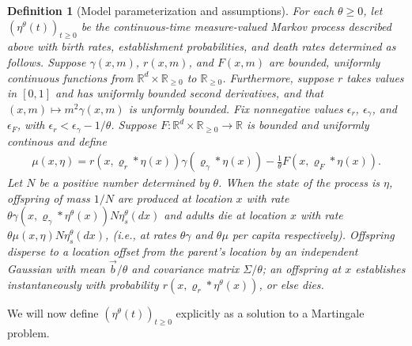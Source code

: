 \documentclass[12pt]{article}
\newtheorem{definition}[theorem]{Definition}
\newcommand{\IR}{\mathbb R}
\newcommand{\meanq}{\vec b}    %
\newcommand{\covq}{\Sigma}     %
\newcommand{\kernel}{\varrho}  %
\newcommand{\smooth}[1]{\kernel_{#1} \! * \!}  %
\begin{document}
\begin{definition}[Model parameterization and assumptions]
    \label{def:model_setup}
    For each $\theta \ge 0$,
    let $\left(\eta^\theta(t)\right)_{t \ge 0}$
    be the continuous-time measure-valued Markov process described above
    with birth rates, establishment probabilities, and death rates
    determined as follows.
    Suppose $\gamma(x, m)$, $r(x, m)$, and $F(x, m)$
    are bounded, uniformly continuous functions
    from $\IR^d \times \IR_{\ge 0}$ to $\IR_{\ge 0}$.
    Furthermore, suppose $r$ takes values in $[0, 1]$
    and has uniformly bounded second derivatives,
    and that $(x, m) \mapsto m^2 \gamma(x, m)$ is unformly bounded.
    Fix nonnegative values $\epsilon_r$, $\epsilon_\gamma$, and $\epsilon_F$,
    with $\epsilon_r < \epsilon_\gamma - 1/\theta$.
    Suppose $F: \IR^d \times \IR_{\ge 0} \to \IR$ is bounded and uniformly continous
    and define
    \begin{align}
        \mu(x, \eta)
        =
        r(x, \smooth{r} \eta(x))
        \gamma(\smooth{\gamma} \eta(x))
        - \frac{1}{\theta}
        F(x, \smooth{F} \eta(x)) .
    \end{align}
    Let $N$ be a positive number determined by $\theta$.
    When the state of the process is $\eta$,
    offspring of mass $1/N$ are produced at location $x$
    with rate $\theta \gamma(x, \smooth{\gamma} \eta^{\theta}(x)) N \eta^{\theta}_s(dx)$
    and adults die at location $x$ with rate $\theta \mu(x, \eta) N \eta^{\theta}_s(dx)$,
    (i.e., at rates $\theta \gamma$ and $\theta \mu$ per capita respectively).
    Offspring disperse to a location offset from the parent's location
    by an independent Gaussian with mean $\meanq/\theta$
    and covariance matrix $\covq / \theta$;
    an offspring at $x$ establishes instantaneously
    with probability $r(x, \smooth{r} \eta^{\theta}(x))$, or else dies.
\end{definition}

We will now define $(\eta^{\theta}(t))_{t \geq 0}$
explicitly as a solution to a Martingale problem.
\end{document}
